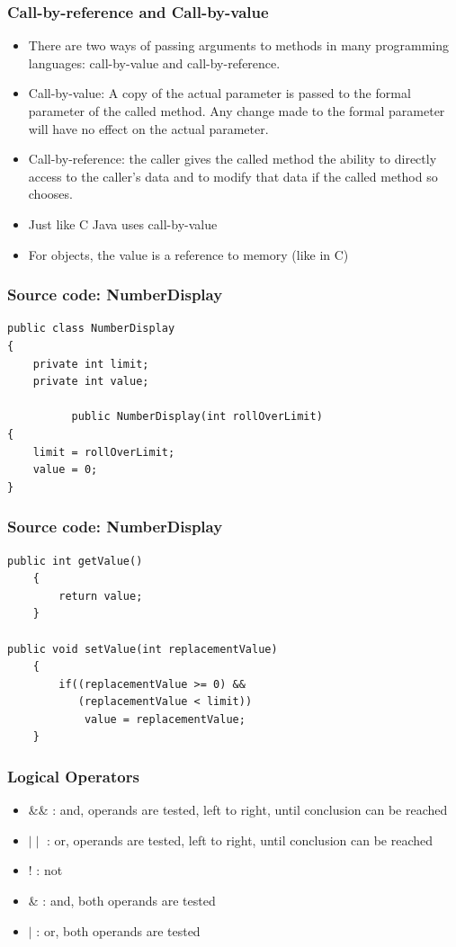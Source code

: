 \documentclass{beamer}
\begin{document}
\begin{frame}
\frametitle{Call-by-reference and Call-by-value}
\begin{itemize}
\item There are two ways of passing arguments to methods in many programming languages: call-by-value and call-by-reference.
\item Call-by-value: A copy of the actual parameter is passed to the formal parameter of the called method. Any change made to the formal parameter will have no effect on the actual parameter.
\item Call-by-reference: the caller gives the called method the ability to directly access to the caller’s data and to modify that data if the called method so chooses.
\item Just like C Java uses call-by-value
\item For objects, the value is a reference to memory (like in C)
\end{itemize}
\end{frame}

\begin{frame}[fragile]
\frametitle{Source code: NumberDisplay}
\begin{lstlisting}
public class NumberDisplay
{
    private int limit;
    private int value;

          public NumberDisplay(int rollOverLimit)‏
{
    limit = rollOverLimit;
    value = 0;
}
\end{lstlisting}
\end{frame}

\begin{frame}[fragile]
\frametitle{Source code: NumberDisplay}
\begin{lstlisting}
public int getValue()‏
    {
        return value;
    }

public void setValue(int replacementValue)‏
    {
        if((replacementValue >= 0) && 
           (replacementValue < limit))‏
            value = replacementValue;
    }
\end{lstlisting}
\end{frame}

\begin{frame}
\frametitle{Logical Operators}
\begin{itemize}
\item \&\& : and, operands are tested, left to right, until conclusion can be reached 
\item $\mid \mid$ : or, operands are tested, left to right, until conclusion can be reached
\item ! : not
\item \& : and, both operands are tested
\item $\mid$ : or, both operands are tested
\end{itemize}
\end{frame}
\end{document}

